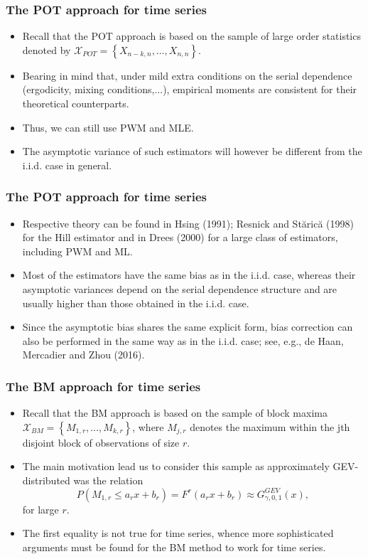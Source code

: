 \documentclass{beamer}
\newcommand{\suit}[1]{\left(#1\right)}
\newcommand{\set}[1]{\left\{#1\right\}}
\begin{document}
\begin{frame}
    \frametitle{The POT approach for time series}

\begin{itemize}
    \item    Recall that the POT approach is based on the sample of large order statistics denoted by $\mathcal{X}_{POT}=\set{X_{n-k,n},\dots, X_{n,n}}$.
    \item Bearing in mind that, under mild extra conditions on the serial
    dependence (ergodicity, mixing conditions,...), empirical moments are consistent for their theoretical counterparts.
    \item Thus, we can still use PWM and MLE.
    \item The asymptotic variance of such estimators will however
    be different from the i.i.d. case in general.
\end{itemize}
\end{frame}

\begin{frame}
    \frametitle{The POT approach for time series}
\begin{itemize}
    \item Respective theory can be found in Hsing (1991); Resnick and Stărică (1998) for the Hill estimator and in Drees (2000) for a large class of estimators, including PWM and ML.
    \item Most of the
    estimators have the same bias as in the i.i.d. case, whereas their asymptotic variances depend
    on the serial dependence structure and are usually higher than those obtained in the i.i.d. case.
    \item Since the asymptotic bias shares the same explicit form, bias correction can also be performed
    in the same way as in the i.i.d. case; see, e.g., de Haan, Mercadier and Zhou (2016).
\end{itemize}
    

\end{frame}

\begin{frame}
    \frametitle{The BM approach for time series}
\begin{itemize}
    \item Recall that the BM approach is based on the sample of block maxima $\mathcal{X}_{BM}=\set{M_{1,r},\dots,M_{k,r}}$, where $M_{j,r}$ denotes the maximum within the jth disjoint block of observations of size $r$.
    \item The main
    motivation lead us to consider this sample as approximately GEV-distributed   was the relation
    $$
P\suit{M_{1,r}\le a_r x+b_r}=F^r(a_r x+b_r)\approx G^{GEV}_{\gamma,0,1}(x),
    $$
    for large $r$. 
    \item The first equality is not true for time series, whence more sophisticated arguments
    must be found for the BM method to work for time series.
\end{itemize}
    

\end{frame}
\end{document}
